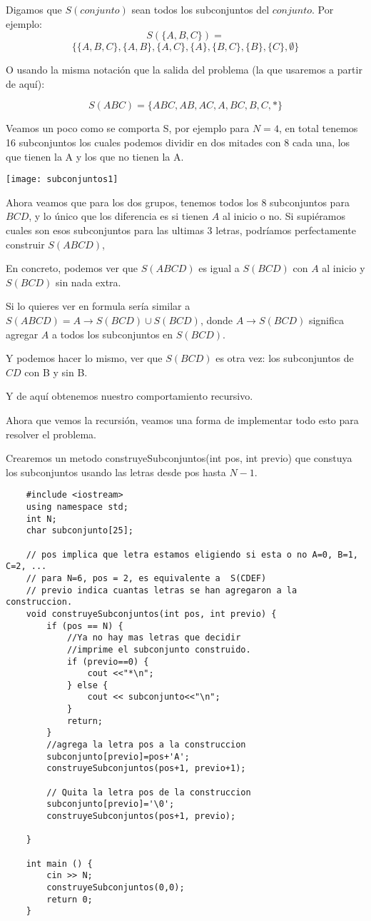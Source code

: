Digamos que \(S(conjunto)\) sean todos los subconjuntos del \(conjunto\). Por ejemplo:
\[S(\{A,B,C\})=\]
\[\{\{A,B,C\},\{A,B\},	\{A,C\},\{A\},\{B,C\},	\{B\},\{C\},	\emptyset\} \]

O usando la misma notación que la salida del problema (la que usaremos a partir de aquí):

\[S(ABC)=\{ABC, AB, AC, A, BC, B, C, * \}\]

Veamos un poco como se comporta S, por ejemplo para \(N = 4\), en total tenemos 16 subconjuntos los cuales podemos dividir en dos mitades con 8 cada una, los que tienen la A y los que no tienen la A.



\begin{center}
	\texttt{[image: subconjuntos1]}
\end{center}

Ahora veamos que para los dos grupos, tenemos todos los 8 subconjuntos para \(BCD\), y lo único que los diferencia es si tienen \(A\) al inicio o no. Si supiéramos cuales son esos subconjuntos para las ultimas 3 letras, podríamos perfectamente construir \(S(ABCD)\), 

En concreto, podemos ver que \(S(ABCD) \) es igual a \(S(BCD)\) con \(A\) al inicio y \(S(BCD)\) sin nada extra. 

Si lo quieres ver en formula sería similar a \(S(ABCD)=A\rightarrow S(BCD) \cup S(BCD)\), donde \(A\rightarrow S(BCD)\) significa agregar \(A\) a todos los subconjuntos en \(S(BCD)\).

Y podemos hacer lo mismo, ver que \(S(BCD)\) es otra vez: los subconjuntos de \(CD\) con B y sin B.

Y de aquí obtenemos nuestro comportamiento recursivo.

Ahora que vemos la recursión, veamos una forma de implementar todo esto para resolver el problema.

Crearemos un metodo construyeSubconjuntos(int pos, int previo) que constuya los subconjuntos usando las letras desde pos hasta \(N-1\).
\pagebreak
\begin{lstlisting}
	#include <iostream>
	using namespace std;
	int N;
	char subconjunto[25];
	
	// pos implica que letra estamos eligiendo si esta o no A=0, B=1, C=2, ...
	// para N=6, pos = 2, es equivalente a  S(CDEF)
	// previo indica cuantas letras se han agregaron a la construccion.
	void construyeSubconjuntos(int pos, int previo) {
		if (pos == N) {
			//Ya no hay mas letras que decidir
			//imprime el subconjunto construido.
			if (previo==0) {
				cout <<"*\n";
			} else {
				cout << subconjunto<<"\n"; 
			}
			return;
		}
		//agrega la letra pos a la construccion
		subconjunto[previo]=pos+'A'; 
		construyeSubconjuntos(pos+1, previo+1); 
		
		// Quita la letra pos de la construccion
		subconjunto[previo]='\0'; 
		construyeSubconjuntos(pos+1, previo); 
		
	}
	
	int main () {
		cin >> N;
		construyeSubconjuntos(0,0);
		return 0;
	}
\end{lstlisting}


